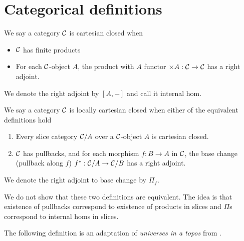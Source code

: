 \section{Categorical definitions}

\begin{dfn}
  We say a category $\mathcal{C}$ is cartesian closed when
  \begin{itemize}
    \item $\mathcal{C}$ has finite products
    \item For each $\mathcal{C}$-object $A$, the product with $A$ functor $\times A : \mathcal{C} \to \mathcal{C}$ has a right adjoint.
  \end{itemize}
  We denote the right adjoint by $[A,-]$ and call it internal hom.
\end{dfn}

\begin{dfn}
  We say a category $\mathcal{C}$ is locally cartesian closed when either of the equivalent definitions hold
  \begin{enumerate}
    \item Every slice category $\mathcal{C} / A$ over a $\mathcal{C}$-object $A$ is cartesian closed.
    \item $\mathcal{C}$ has pullbacks, and for each morphism $f : B \to A$ in $\mathcal{C}$,
          the base change (pullback along $f$) $f^{*} : \mathcal{C} / A \to \mathcal{C} / B$ has a right adjoint.
  \end{enumerate}
  We denote the right adjoint to base change by $\Pi_{f}$.
\end{dfn}

We do not show that these two definitions are equivalent.
The idea is that existence of pullbacks correspond to existence of products in slices
and $\Pi$s correspond to internal homs in slices.

The following definition is an adaptation of \textit{universes in a topos} from \cite{streicher}.

